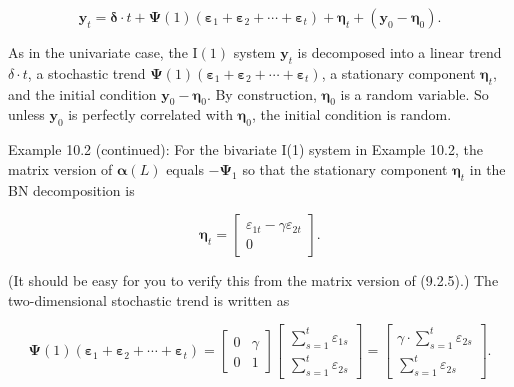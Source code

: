 \documentclass[10pt]{article}
\begin{document}
\begin{equation*}
\mathbf{y}_{t}=\boldsymbol{\delta} \cdot t+\boldsymbol{\Psi}(1)\left(\boldsymbol{\varepsilon}_{1}+\boldsymbol{\varepsilon}_{2}+\cdots+\boldsymbol{\varepsilon}_{t}\right)+\boldsymbol{\eta}_{t}+\left(\mathbf{y}_{0}-\boldsymbol{\eta}_{0}\right) . \tag{10.1.16}
\end{equation*}


As in the univariate case, the $\mathrm{I}(1)$ system $\mathbf{y}_{t}$ is decomposed into a linear trend $\delta \cdot t$, a stochastic trend $\boldsymbol{\Psi}(1)\left(\boldsymbol{\varepsilon}_{1}+\boldsymbol{\varepsilon}_{2}+\cdots+\boldsymbol{\varepsilon}_{t}\right)$, a stationary component $\boldsymbol{\eta}_{t}$, and the initial condition $\mathbf{y}_{0}-\boldsymbol{\eta}_{0}$. By construction, $\boldsymbol{\eta}_{0}$ is a random variable. So unless $\mathbf{y}_{0}$ is perfectly correlated with $\boldsymbol{\eta}_{0}$, the initial condition is random.

Example 10.2 (continued): For the bivariate I(1) system in Example 10.2, the matrix version of $\boldsymbol{\alpha}(L)$ equals $-\boldsymbol{\Psi}_{1}$ so that the stationary component $\boldsymbol{\eta}_{t}$ in the BN decomposition is

\[
\boldsymbol{\eta}_{t}=\left[\begin{array}{c}
\varepsilon_{1 t}-\gamma \varepsilon_{2 t}  \tag{10.1.17}\\
0
\end{array}\right] .
\]

(It should be easy for you to verify this from the matrix version of (9.2.5).) The two-dimensional stochastic trend is written as

\[
\boldsymbol{\Psi}(1)\left(\boldsymbol{\varepsilon}_{1}+\boldsymbol{\varepsilon}_{2}+\cdots+\boldsymbol{\varepsilon}_{t}\right)=\left[\begin{array}{cc}
0 & \gamma  \tag{10.1.18}\\
0 & 1
\end{array}\right]\left[\begin{array}{c}
\sum_{s=1}^{t} \varepsilon_{1 s} \\
\sum_{s=1}^{t} \varepsilon_{2 s}
\end{array}\right]=\left[\begin{array}{c}
\gamma \cdot \sum_{s=1}^{t} \varepsilon_{2 s} \\
\sum_{s=1}^{t} \varepsilon_{2 s}
\end{array}\right] .
\]
\end{document}
